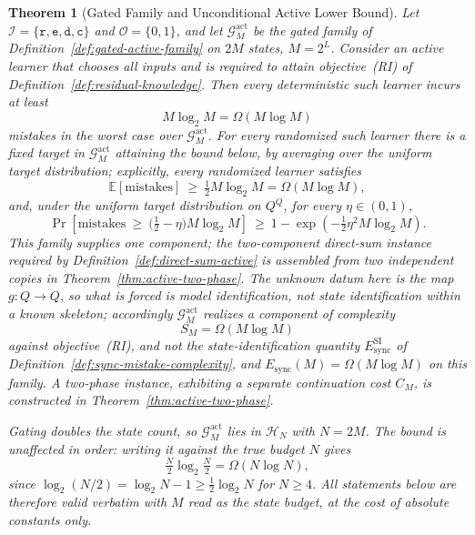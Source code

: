 \documentclass[12pt]{article}
\newtheorem{theorem}{Theorem}[section]
\theoremstyle{definition}
\newcommand{\Esync}{E_{\mathrm{sync}}}
\newcommand{\EsyncSI}{E_{\mathrm{sync}}^{\mathrm{SI}}}
\newcommand{\Gact}{\mathcal G^{\mathrm{act}}}
\begin{document}
\begin{theorem}[Gated Family and Unconditional Active Lower Bound]
\label{thm:active-explicit-directsum}
Let $\mathcal I=\{\mathtt r,\mathtt e,\mathtt d,\mathtt c\}$ and
$\mathcal O=\{0,1\}$, and let $\Gact_{M}$ be the \emph{gated} family of
Definition~\ref{def:gated-active-family} on $2M$ states, $M=2^L$.  Consider an
active learner that chooses all inputs and is required to attain
objective~(RI) of Definition~\ref{def:residual-knowledge}.  Then
every \emph{deterministic} such learner incurs at least
\[
M\log_2M
=
\Omega(M\log M)
\]
mistakes in the worst case over $\Gact_M$.  For every \emph{randomized} such
learner there is a fixed target in $\Gact_M$ attaining the bound below, by
averaging over the uniform target distribution; explicitly, every randomized
learner satisfies
\[
\mathbb E[\text{mistakes}]
\ \ge\
\tfrac12M\log_2M
=
\Omega(M\log M),
\]
and, under the uniform target distribution on $Q^Q$, for every
$\eta\in(0,1)$,
\[
\Pr\left[
\text{mistakes}\ \ge\ \bigl(\tfrac12-\eta\bigr)M\log_2M
\right]
\ \ge\
1-\exp\!\left(-\tfrac12\eta^2M\log_2M\right).
\]
This family supplies \emph{one} component; the two-component direct-sum
instance required by Definition~\ref{def:direct-sum-active} is assembled from
two independent copies in Theorem~\ref{thm:active-two-phase}.  The unknown
datum here is the map $g:Q\to Q$, so what is forced is \emph{model}
identification, not state identification within a known skeleton; accordingly
$\Gact_M$ realizes a component of complexity
\[
S_M=\Omega(M\log M)
\]
against objective~(RI), and not the state-identification quantity $\EsyncSI$
of Definition~\ref{def:sync-mistake-complexity},
and $\Esync(M)=\Omega(M\log M)$ on this family.  A two-phase instance,
exhibiting a separate continuation cost $C_M$, is constructed in
Theorem~\ref{thm:active-two-phase}.

Gating doubles the state count, so $\Gact_M$ lies in $\mathcal H_{N}$ with
$N=2M$.  The bound is unaffected in order: writing it against the true budget
$N$ gives
\[
\tfrac{N}{2}\log_2\tfrac{N}{2}
=
\Omega(N\log N),
\]
since $\log_2(N/2)=\log_2N-1\ge\tfrac12\log_2N$ for $N\ge4$.  All statements
below are therefore valid verbatim with $M$ read as the state budget, at the
cost of absolute constants only.
\end{theorem}
\end{document}
